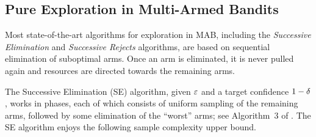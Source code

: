 \documentclass[12pt]{article}
\begin{document}
%



\subsection{Pure Exploration in Multi-Armed Bandits}


Most state-of-the-art algorithms for exploration in MAB, including the \emph{Successive Elimination} \cite{evendar06} and \emph{Successive Rejects} \cite{audibert10} algorithms, are based on sequential elimination of suboptimal arms. 
Once an arm is eliminated, it is never pulled again and resources are directed towards the remaining arms.

The Successive Elimination (SE) algorithm, 
given $\varepsilon$ and a target confidence $1-\delta$, works in phases, each of which consists of uniform sampling of the remaining arms, followed by some elimination of the ``worst'' arms; see Algorithm~3 of \citet{evendar06}.
The SE algorithm enjoys the following sample complexity upper bound.
\end{document}
